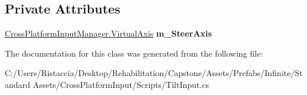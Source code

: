 \subsection*{Private Attributes}
\begin{DoxyCompactItemize}
\item 
\mbox{\label{class_unity_standard_assets_1_1_cross_platform_input_1_1_tilt_input_ab31eebbc939a08dba1bbda14b75d1498}} 
\hyperlink{class_unity_standard_assets_1_1_cross_platform_input_1_1_cross_platform_input_manager_1_1_virtual_axis}{Cross\+Platform\+Input\+Manager.\+Virtual\+Axis} {\bfseries m\+\_\+\+Steer\+Axis}
\end{DoxyCompactItemize}


The documentation for this class was generated from the following file\+:\begin{DoxyCompactItemize}
\item 
C\+:/\+Users/\+Ristaccia/\+Desktop/\+Rehabilitation/\+Capstone/\+Assets/\+Prefabs/\+Infinite/\+Standard Assets/\+Cross\+Platform\+Input/\+Scripts/Tilt\+Input.\+cs\end{DoxyCompactItemize}
